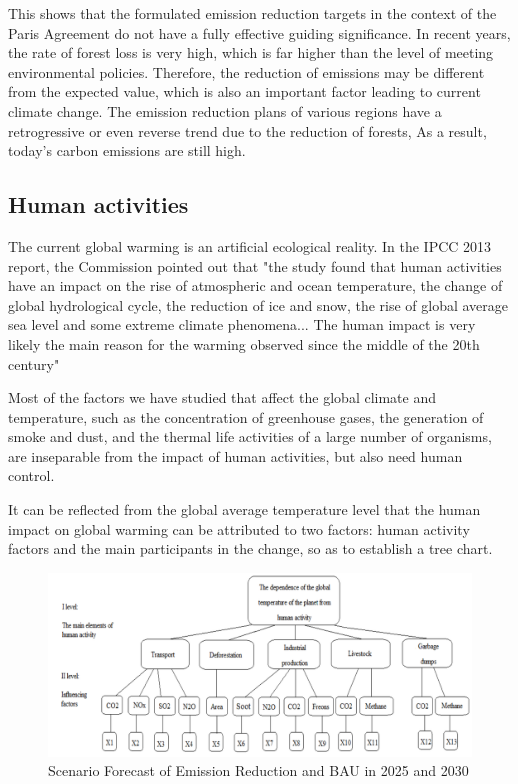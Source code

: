 \documentclass{apmcmthesis}
\begin{document}
This shows that the formulated emission reduction targets in the context of the Paris Agreement do not have a fully effective guiding significance. In recent years, the rate of forest loss is very high, which is far higher than the level of meeting environmental policies. Therefore, the reduction of emissions may be different from the expected value, which is also an important factor leading to current climate change. The emission reduction plans of various regions have a retrogressive or even reverse trend due to the reduction of forests, As a result, today's carbon emissions are still high.

\subsection{Human activities}
The current global warming is an artificial ecological reality. In the IPCC 2013 report, the Commission pointed out that "the study found that human activities have an impact on the rise of atmospheric and ocean temperature, the change of global hydrological cycle, the reduction of ice and snow, the rise of global average sea level and some extreme climate phenomena... The human impact is very likely the main reason for the warming observed since the middle of the 20th century"\cite{109}

Most of the factors we have studied that affect the global climate and temperature, such as the concentration of greenhouse gases, the generation of smoke and dust, and the thermal life activities of a large number of organisms, are inseparable from the impact of human activities, but also need human control. 

It can be reflected from the global average temperature level that the human impact on global warming can be attributed to two factors: human activity factors and the main participants in the change, so as to establish a tree chart.

 \begin{figure} 
    \centering
    \includegraphics[width=13cm]{APMCMThesis/figures/tu3.png}
    \caption{Scenario Forecast of Emission Reduction and BAU in 2025 and 2030}
\label{relationship}
\end{figure}
\end{document}
